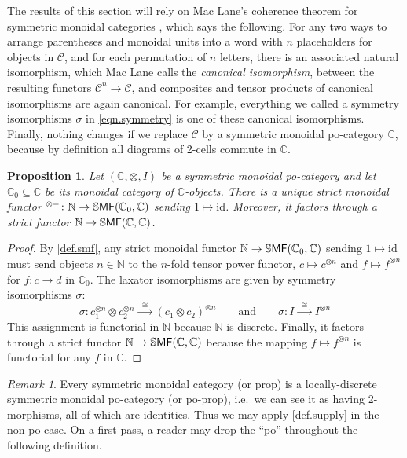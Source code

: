 \documentclass[11pt, oneside, article]{memoir}
\theoremstyle{plain}
\newtheorem{proposition}[theorem]{Proposition}
\theoremstyle{definition}
\theoremstyle{remark}
\newtheorem{remark}[theorem]{Remark}
\newcommand{\cat}[1]{\mathcal{#1}}%
\newcommand{\Cat}[1]{{\mathsf{#1}}}%
\newcommand{\CCat}[1]{\mathbb{\StrLeft{#1}{1}}\Cat{\StrGobbleLeft{#1}{1}}}%
\newcommand{\funn}[1]{\mathrm{#1}}%
\newcommand{\tpow}[1]{^{\otimes #1}}
\newcommand{\ssmf}{\CCat{SMF}}
\newcommand{\cc}{\mathbb{C}}
\newcommand{\nn}{\mathbb{N}}
\newcommand{\id}{\funn{id}}
\newcommand{\To}[1]{\xrightarrow{#1}}
\newcommand{\Too}[1]{\To{\;\;#1\;\;}}
\renewcommand{\ss}{\subseteq}
\newcommand{\qqand}{\qquad\text{and}\qquad}
\begin{document}
The results of this section will rely on Mac Lane's coherence theorem for symmetric monoidal categories \cite[Theorem XI.1]{maclane:1998a}, which says the following. For any two ways to arrange parentheses and monoidal units into a word with $n$ placeholders for objects in $\cat{C}$, and for each permutation of $n$ letters, there is an associated natural isomorphism, which Mac Lane calls the \emph{canonical isomorphism}, between the resulting functors $\cat{C}^n\to\cat{C}$, and composites and tensor products of canonical isomorphisms are again canonical. For example, everything we called a symmetry isomorphisms $\sigma$ in \cref{eqn.symmetry} is one of these canonical isomorphisms. Finally, nothing changes if we replace $\cat{C}$ by a symmetric monoidal po-category $\cc$, because by definition all diagrams of 2-cells commute in $\cc$.

\begin{proposition}\label{prop.homomorphically_supply_objects}
Let $(\cc,\otimes,I)$ be a symmetric monoidal po-category and let $\cc_0\ss\cc$ be its monoidal category of $\cc$-objects. There is a unique strict monoidal functor $\tpow{-}\colon\nn\to\ssmf(\cc_0,\cc)$ sending $1\mapsto\id$. Moreover, it factors through a strict functor $\nn\to\ssmf(\cc,\cc)$.
\end{proposition}
\begin{proof}
By \cref{def.smf}, any strict monoidal functor $\nn\to\ssmf(\cc_0,\cc)$ sending $1\mapsto\id$ must send objects $n\in\nn$ to the $n$-fold tensor power functor, $c\mapsto c\tpow{n}$  and $f\mapsto f\tpow{n}$ for $f\colon c\to d$ in $\cc_0$. The laxator isomorphisms are given by symmetry isomorphisms $\sigma$:
\begin{equation}\label{eqn.symmetry_c1c2}
  \sigma\colon 
  c_1\tpow{n}\otimes c_2\tpow{n}
  \Too{\cong}
  (c_1\otimes c_2)\tpow{n}
  \qqand
  \sigma\colon I\Too{\cong}I\tpow{n}
\end{equation}
This assignment is functorial in $\nn$ because $\nn$ is discrete. Finally, it factors through a strict functor $\nn\to\ssmf(\cc,\cc)$ because the mapping $f\mapsto f\tpow{n}$ is functorial for any $f$ in $\cc$.
\end{proof}

\begin{remark}
Every symmetric monoidal category (or prop) is a locally-discrete symmetric monoidal po-category (or po-prop), i.e.\ we can see it as having 2-morphisms, all of which are identities. Thus we may apply \cref{def.supply} in the non-po case. On a first pass, a reader may drop the ``po'' throughout the following definition.
\end{remark}
\end{document}
